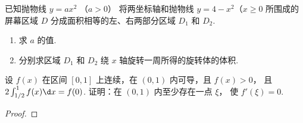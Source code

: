 \documentclass[quiet]{ctexart}
\begin{document}
\begin{problem}[8 pt]
  已知抛物线 $y = ax^2$ （$a > 0$） 将两坐标轴和抛物线 $y = 4 - x^2$（$x \geq 0$
  所围成的屏幕区域 $D$ 分成面积相等的左、右两部分区域 $D_1$ 和 $D_2$.
  \begin{enumerate}
    \item 求 $a$ 的值.
    \item 分别求区域 $D_1$ 和 $D_2$ 绕 $x$ 轴旋转一周所得的旋转体的体积.
  \end{enumerate}
\end{problem}
\begin{solution}
  
\end{solution}

\begin{problem}[4 pt]
  设 $f(x)$ 在区间 $[0,1]$ 上连续，在 $(0,1)$ 内可导，且 $f(x) > 0$，
  且 $2\int_{1/2}^1 f(x) \d x = f(0)$. 证明：在 $(0,1)$ 内至少存在一点 $\xi$，
  使 $f'(\xi) = 0$.
\end{problem}
\begin{solution}
  \begin{proof}
    
  \end{proof}
\end{solution}
\end{document}
